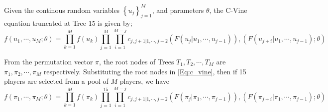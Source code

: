 				\begin{lem}\cite{bibid}
					Given the continous random variables $\left\{u_{j}\right\}_{j=1}^{M}$, and parameters $\theta$, the C-Vine equation truncated at Tree 15 is given by;
					\begin{equation}\label{Eq:c_vine}
						f\left(u_1, \cdots, u_M ; \theta \right) = \prod_{k=1}^{M}f\left(u_{k}\right) \prod_{j=1}^{M} \prod_{i=1}^{M-j}
						c_{j, j+1 | 1, \cdots, j-2}
						\left( F\left(u_{j} | u_1, \cdots, u_{j-1}\right)\right), \left( F\left(u_{j+i} | u_1, \cdots, u_{j-1}\right); \theta\right)
					\end{equation}
				\end{lem}

				From the permutation vector $\pi$, the root nodes of Trees $T_1, T_2, \cdots, T_M$ are $\pi_1, \pi_2, \cdots, \pi_{M}$ respectively. Substituting the root nodes in \ref{Eq:c_vine}, then if 15 players are selected from a pool of $M$ players, we have
				\begin{equation}\label{Eq:c_vine_pi}
					f\left(\pi_1, \cdots, \pi_M ; \theta \right) = \prod_{k=1}^{M}f\left(\pi_{k}\right) \prod_{j=1}^{15} \prod_{i=1}^{M-j}
					c_{j, j+1 | 1, \cdots, j-2}
					\left( F\left(\pi_{j} | \pi_1, \cdots, \pi_{j-1}\right)\right), \left( F\left(\pi_{j+i} | \pi_1, \cdots, \pi_{j-1}\right); \theta\right)
				\end{equation}


